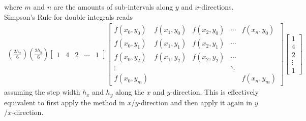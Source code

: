 where $m$ and $n$ are the amounts of sub-intervals along $y$ and $x$-directions. Simpson's Rule for double integrals reads
\begin{align*}
(\frac{2h_x}{6})(\frac{2h_y}{6})
\begin{bmatrix}
1 & 4 & 2 & \cdots & 1
\end{bmatrix}
\begin{bmatrix}
f(x_0,y_0) & f(x_1, y_0) & f(x_2, y_0) & \cdots & f(x_n, y_0) \\
f(x_0,y_1) & f(x_1, y_1) & f(x_2, y_1) & \cdots & \\
f(x_0,y_2) & f(x_1, y_2) & f(x_2, y_2) & \cdots & \\
\vdots & & & \ddots & \\
f(x_0,y_m) & & & & f(x_n,y_m)
\end{bmatrix}
\begin{bmatrix}
1 \\
4 \\
2 \\
\vdots \\
1
\end{bmatrix}   
\end{align*}
assuming the step width $h_x$ and $h_y$ along the $x$ and $y$-direction. This is effectively equivalent to first apply the method in $x$/$y$-direction and then apply it again in $y$/$x$-direction.

